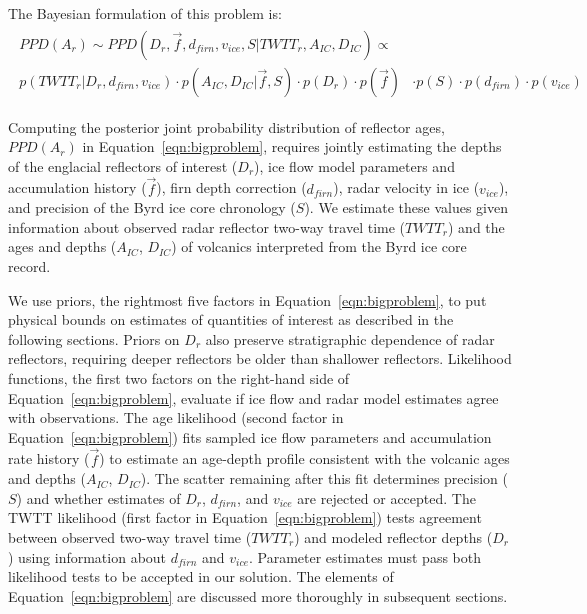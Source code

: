 The Bayesian formulation of this problem is:
\begin{equation}\label{eqn:bigproblem}
\begin{split} %
\begin{aligned}
PPD(A_r)  \sim  PPD(D_r,\vec{f},d_{firn},v_{ice},S | TWTT_r,A_{IC},D_{IC})  \propto & \\
        p(TWTT_r | D_r,d_{firn},v_{ice}) \cdot p(A_{IC},D_{IC} | \vec{f},S)  \cdot p(D_r) \cdot p(\vec{f}) &\cdot p(S) \cdot p(d_{firn})\cdot p(v_{ice})
\end{aligned}
\end{split}
\end{equation}

Computing the posterior joint probability distribution of reflector ages, $PPD(A_r)$ in Equation~\ref{eqn:bigproblem}, requires jointly estimating the depths of the englacial reflectors of interest ($D_r$), ice flow model parameters and accumulation history ($\vec{f}$), firn depth correction ($d_{firn}$), radar velocity in ice ($v_{ice}$), and precision of the Byrd ice core chronology ($S$). We estimate these values given information about observed radar reflector two-way travel time ($TWTT_r$) and the ages and depths ($A_{IC}$, $D_{IC}$) of volcanics interpreted from the Byrd ice core record. 


We use priors, the rightmost five factors in Equation~\ref{eqn:bigproblem}, to put physical bounds on estimates of quantities of interest as described in the following sections. Priors on ${D_r}$ also preserve stratigraphic dependence of radar reflectors, requiring deeper reflectors be older than shallower reflectors. Likelihood functions, the first two factors on the right-hand side of Equation~\ref{eqn:bigproblem}, evaluate if ice flow and radar model estimates agree with observations. The age likelihood (second factor in Equation~\ref{eqn:bigproblem}) fits sampled ice flow parameters and accumulation rate history ($\vec{f}$) to estimate an age-depth profile consistent with the volcanic ages and depths ($A_{IC}$, $D_{IC}$). The scatter remaining after this fit determines precision ($S$) and whether estimates of $D_r$, $d_{firn}$, and $v_{ice}$ are rejected or accepted. The TWTT likelihood (first factor in Equation~\ref{eqn:bigproblem}) tests %
agreement between observed two-way travel time ($TWTT_r$) and modeled reflector depths ($D_r$) using information about $d_{firn}$ and $v_{ice}$. Parameter estimates must pass both likelihood tests to be accepted in our solution. The elements of Equation~\ref{eqn:bigproblem} are discussed more thoroughly in subsequent sections. %

